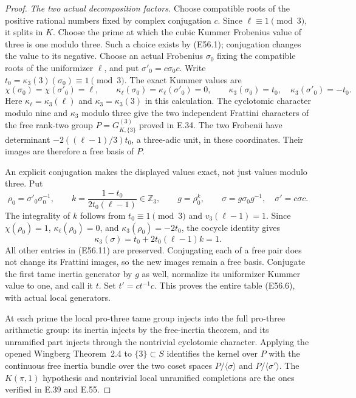 \begin{proof}
\emph{The two actual decomposition factors.}
Choose compatible roots of the positive rational numbers
fixed by complex conjugation $c$. Since $\ell\equiv1\pmod3$,
it splits in $K$. Choose the prime at which the cubic
Kummer Frobenius value of three is one modulo three.
Such a choice exists by (E56.1); conjugation changes
the value to its negative. Choose an actual Frobenius
$\sigma_0$ fixing the compatible roots of the
uniformizer $\ell$, and put $\sigma'_0=c\sigma_0c$.
Write $t_0=\kappa_3(3)(\sigma_0)\equiv1\pmod3$.
The exact Kummer values are
\[
 \chi(\sigma_0)=\chi(\sigma'_0)=\ell,\qquad
 \kappa_\ell(\sigma_0)=\kappa_\ell(\sigma'_0)=0,\qquad
 \kappa_3(\sigma_0)=t_0,\quad
 \kappa_3(\sigma'_0)=-t_0 .
 \tag{E56.11}
\]
Here $\kappa_\ell=\kappa_3(\ell)$ and
$\kappa_3=\kappa_3(3)$ in this calculation.
The cyclotomic character modulo nine and
$\kappa_3$ modulo three give the two independent
Frattini characters of the free rank-two group
$P=G_{K,\{3\}}^{(3)}$ proved in E.34.
The two Frobenii have determinant
$-2((\ell-1)/3)t_0$, a three-adic unit, in these
coordinates. Their images are therefore a free
basis of $P$.

An explicit conjugation makes the displayed values exact,
not just values modulo three. Put
\[
 \rho_0=\sigma'_0\sigma_0^{-1},\qquad
 k=\frac{1-t_0}{2t_0(\ell-1)}\in\mathbb Z_3,\qquad
 g=\rho_0^k,\qquad
 \sigma=g\sigma_0g^{-1},\quad \sigma'=c\sigma c .
 \tag{E56.12}
\]
The integrality of $k$ follows from
$t_0\equiv1\pmod3$ and $v_3(\ell-1)=1$.
Since $\chi(\rho_0)=1$,
$\kappa_\ell(\rho_0)=0$, and
$\kappa_3(\rho_0)=-2t_0$, the cocycle identity gives
\[
 \kappa_3(\sigma)
   =t_0+2t_0(\ell-1)k=1.
 \tag{E56.13}
\]
All other entries in (E56.11) are preserved.
Conjugating each of a free pair does not change
its Frattini images, so the new images remain
a free basis. Conjugate the first tame inertia
generator by $g$ as well, normalize its
uniformizer Kummer value to one, and call it $t$.
Set $t'=ct^{-1}c$. This proves the entire table
(E56.6), with actual local generators.

At each prime the local pro-three tame group
injects into the full pro-three arithmetic group:
its inertia injects by the free-inertia theorem,
and its unramified part injects through the
nontrivial cyclotomic character. Applying the
opened Wingberg Theorem~2.4
\cite{E_WingbergRiemann} to $\{3\}\subset S$
identifies the kernel over $P$ with the continuous
free inertia bundle over the two coset spaces
$P/\langle\sigma\rangle$ and
$P/\langle\sigma'\rangle$.
The $K(\pi,1)$ hypothesis and nontrivial local
unramified completions are the ones verified
in E.39 and E.55.


\end{proof}
